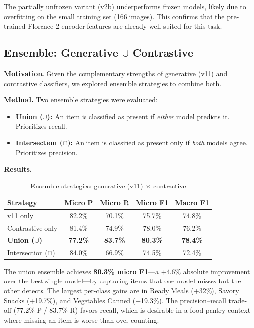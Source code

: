 The partially unfrozen variant (v2b) underperforms frozen models, likely due to overfitting on the small training set (166 images). This confirms that the pre-trained Florence-2 encoder features are already well-suited for this task.

\subsection{Ensemble: Generative $\cup$ Contrastive}
\label{ssec:ensemble}

\textbf{Motivation.} Given the complementary strengths of generative (v11) and contrastive classifiers, we explored ensemble strategies to combine both.

\textbf{Method.} Two ensemble strategies were evaluated:
\begin{itemize}[nosep,leftmargin=1.5em]
  \item \textbf{Union ($\cup$):} An item is classified as present if \textit{either} model predicts it. Prioritizes recall.
  \item \textbf{Intersection ($\cap$):} An item is classified as present only if \textit{both} models agree. Prioritizes precision.
\end{itemize}

\textbf{Results.}

\begin{table}[h]
\centering
\caption{Ensemble strategies: generative (v11) $\times$ contrastive}
\label{tab:ensemble}
\begin{tabular}{lcccc}
\toprule
Strategy & Micro P & Micro R & Micro F1 & Macro F1 \\
\midrule
v11 only & 82.2\% & 70.1\% & 75.7\% & 74.8\% \\
Contrastive only & 81.4\% & 74.9\% & 78.0\% & 76.2\% \\
\textbf{Union ($\cup$)} & \textbf{77.2\%} & \textbf{83.7\%} & \textbf{80.3\%} & \textbf{78.4\%} \\
Intersection ($\cap$) & 84.0\% & 66.9\% & 74.5\% & 72.4\% \\
\bottomrule
\end{tabular}
\end{table}

The union ensemble achieves \textbf{80.3\% micro F1}—a +4.6\% absolute improvement over the best single model—by capturing items that one model misses but the other detects. The largest per-class gains are in Ready Meals (+32\%), Savory Snacks (+19.7\%), and Vegetables Canned (+19.3\%). The precision--recall trade-off (77.2\% P / 83.7\% R) favors recall, which is desirable in a food pantry context where missing an item is worse than over-counting.

